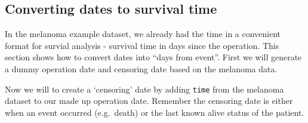 \documentclass[]{book}
\makeatletter
\newenvironment{Shaded}{\begin{snugshade}}{\end{snugshade}}
\newcommand{\KeywordTok}[1]{\textcolor[rgb]{0.13,0.29,0.53}{\textbf{#1}}}
\newcommand{\DataTypeTok}[1]{\textcolor[rgb]{0.13,0.29,0.53}{#1}}
\newcommand{\DecValTok}[1]{\textcolor[rgb]{0.00,0.00,0.81}{#1}}
\newcommand{\StringTok}[1]{\textcolor[rgb]{0.31,0.60,0.02}{#1}}
\newcommand{\CommentTok}[1]{\textcolor[rgb]{0.56,0.35,0.01}{\textit{#1}}}
\newcommand{\OperatorTok}[1]{\textcolor[rgb]{0.81,0.36,0.00}{\textbf{#1}}}
\newcommand{\NormalTok}[1]{#1}
\newenvironment{kframe}{%
\medskip{}
\setlength{\fboxsep}{.8em}
 \def\at@end@of@kframe{}%
 \ifinner\ifhmode%
  \def\at@end@of@kframe{\end{minipage}}%
  \begin{minipage}{\columnwidth}%
 \fi\fi%
 \def\FrameCommand##1{\hskip\@totalleftmargin \hskip-\fboxsep
 \colorbox{shadecolor}{##1}\hskip-\fboxsep
     \hskip-\linewidth \hskip-\@totalleftmargin \hskip\columnwidth}%
 \MakeFramed {\advance\hsize-\width
   \@totalleftmargin\z@ \linewidth\hsize
   \@setminipage}}%
 {\par\unskip\endMakeFramed%
 \at@end@of@kframe}
\renewenvironment{Shaded}{\begin{kframe}}{\end{kframe}}
\makeatother
\begin{document}
\subsection{Converting dates to survival
time}\label{converting-dates-to-survival-time}

In the melanoma example dataset, we already had the time in a convenient
format for survial analysis - survival time in days since the operation.
This section shows how to convert dates into ``days from event''. First
we will generate a dummy operation date and censoring date based on the
melanoma data.

\begin{Shaded}
\end{Shaded}

Now we will to create a `censoring' date by adding \texttt{time} from
the melanoma dataset to our made up operation date. Remember the
censoring date is either when an event occurred (e.g.~death) or the last
known alive status of the patient.

\begin{Shaded}
\end{Shaded}
\end{document}
